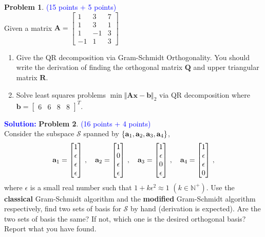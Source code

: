 \documentclass[english,onecolumn]{IEEEtran}
\begin{document}
\noindent\textbf{Problem 1}. \textcolor{blue}{(15 points + 5 points)}\\
Given a matrix $\mathbf{A} = \begin{bmatrix}
 1 &  3 &  7 \\ 
 1 &  3 &  1  \\ 
 1 &  -1 &  3 \\ 
 -1&  1 &  3 
\end{bmatrix}$ \\
\begin{enumerate}
    \item Give the QR decomposition via Gram-Schmidt Orthogonality. You  should  write  the  derivation  of finding the  orthogonal matrix $\mathbf{Q}$  and upper triangular matrix $\mathbf{R}$.
    \item Solve least squares problems $\min \Vert \mathbf{Ax} - \mathbf{b} \Vert_2$ via  QR decomposition where $\mathbf{b} = \begin{bmatrix}
 6 & 6 & 8&8 \end{bmatrix}^T$.
\end{enumerate}
\noindent\textcolor{blue}{
	\textbf{Solution:}
}
\newpage
\noindent\textbf{Problem 2}. \textcolor{blue}{(16 points + 4 points)}\\
Consider the subspace $\mathcal{S}$ spanned by $\{{\bf a}_1, {\bf a}_2, {\bf a}_3, {\bf a}_4\}$,
	\[
	{\bf a}_1 = \begin{bmatrix} 1 \\ \epsilon \\ \epsilon \\ \epsilon \end{bmatrix}\,,\quad 
	{\bf a}_2 =  \begin{bmatrix}1 \\0 \\ \epsilon \\ \epsilon \end{bmatrix}\,,\quad 
	{\bf a}_3 =  \begin{bmatrix}1 \\ \epsilon \\ 0 \\ \epsilon\end{bmatrix}\,,\quad
	{\bf a}_4 =  \begin{bmatrix}1 \\ \epsilon \\  \epsilon  \\ 0\end{bmatrix}\,,
	\]
	where $\epsilon$ is a small real number such that $1+k\epsilon^2  \approx 1$ $(k\in\mathbb{N}^+)$. Use the \textbf{classical} Gram-Schmidt algorithm and the \textbf{modified} Gram-Schmidt algorithm respectively, find two sets of basis for $\mathcal{S}$ by hand (derivation is expected). Are the two sets of basis the same? If not, which one is the desired orthogonal basis? Report what you have found.
\end{document}
